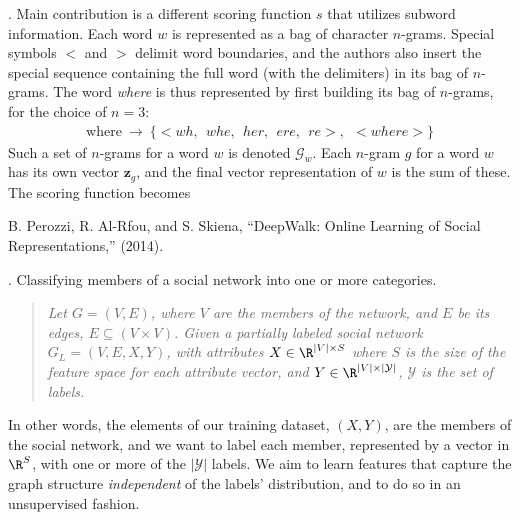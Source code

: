 \documentclass[11pt]{article}
\renewcommand\vec[2][]{\bm{#2}_{#1}}
\newcommand\myspace[1][]{\vspace{#1\bigskipamount}}
\newcommand\p{\Needspace{10\baselineskip} \noindent}
\begin{document}
\myspace
\p {}. Main contribution is a different scoring function $s$ that utilizes subword information. Each word $w$ is represented as a bag of character $n$-grams. Special symbols $<$ and $>$ delimit word boundaries, and the authors also insert the special sequence containing the full word (with the delimiters) in its bag of $n$-grams. The word \textit{where} is thus represented by first building its bag of $n$-grams, for the choice of $n=3$:
\begin{align}
	\text{where} ~ \longrightarrow ~  \{    
		<wh,~~ whe,~~ her,~~ ere,~~ re>,~~ <where>
	\}
\end{align}
Such a set of $n$-grams for a word $w$ is denoted $\mathcal{G}_w$. Each $n$-gram $g$ for a word $w$ has its own vector $\vec[g]{z}$, and the final vector representation of $w$ is the sum of these. The scoring function becomes
\graybox{
	s(w, c) &= \sum_{g \in \mathcal{G}_w} \vec[g]{z}^T \vec[c]{v}
	}





\vspace{-1em}
{\footnotesize B. Perozzi, R. Al-Rfou, and S. Skiena, ``DeepWalk: Online Learning of Social Representations,'' (2014).}

\p {}. Classifying members of a social network into one or more categories. 
\vspace{-1em}
\begin{quote}
	{\itshape Let $G = (V, E)$, where $V$ are the members of the network, and $E$ be its edges, $E \subseteq (V \times V)$. Given a partially labeled social network $G_L = (V, E, X, Y)$, with attributes $X \in \R^{|V| \times S}$ where $S$ is the size of the feature space for each attribute vector, and $Y \in \R^{|V| \times |\mathcal{Y}|}$, $\mathcal{Y}$ is the set of labels.}
\end{quote}
\vspace{-1em}
In other words, the elements of our training dataset, $(X, Y)$, are the members of the social network, and we want to label each member, represented by a vector in $\R^S$, with one or more of the $|\mathcal{Y}|$ labels. We aim to learn features that capture the graph structure \textit{independent} of the labels' distribution, and to do so in an unsupervised fashion.
\end{document}
